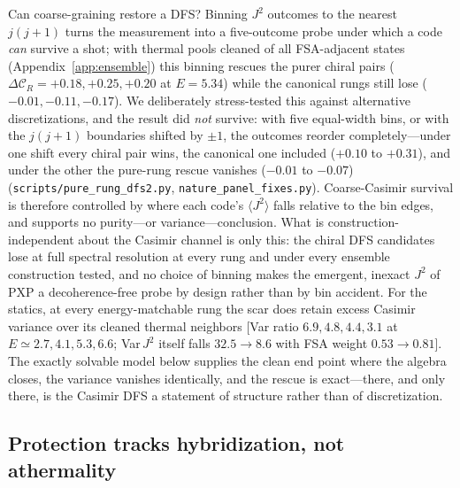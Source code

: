 \documentclass[a4paper,11pt,twocolumn,unpublished]{quantumarticle}
\newcommand{\CR}{\mathcal{C}_R}
\begin{document}
Can coarse-graining restore a DFS? Binning $J^2$ outcomes to the nearest
$j(j{+}1)$ turns the measurement into a five-outcome probe under which a
code \emph{can} survive a shot; with thermal pools cleaned of all
FSA-adjacent states (Appendix~\ref{app:ensemble}) this binning rescues the
purer chiral pairs ($\Delta\CR=+0.18,+0.25,+0.20$ at $E=5.34$) while the
canonical rungs still lose ($-0.01,-0.11,-0.17$). We deliberately
stress-tested this against alternative discretizations, and the result did
\emph{not} survive: with five equal-width bins, or with the $j(j{+}1)$
boundaries shifted by $\pm1$, the outcomes reorder completely---under one
shift every chiral pair wins, the canonical one included
($+0.10$ to $+0.31$), and under the other the pure-rung rescue vanishes
($-0.01$ to $-0.07$)
(\texttt{scripts/pure\_rung\_dfs2.py}, \texttt{nature\_panel\_fixes.py}).
Coarse-Casimir survival is therefore controlled by where each code's
$\langle J^2\rangle$ falls relative to the bin edges, and supports no
purity---or variance---conclusion. What is construction-independent about
the Casimir channel is only this: the chiral DFS candidates lose at full
spectral resolution at every rung and under every ensemble construction
tested, and no choice of binning makes the emergent, inexact $J^2$ of PXP a
decoherence-free probe by design rather than by bin accident. For the
statics, at every energy-matchable rung the scar does retain excess Casimir
variance over its cleaned thermal neighbors [Var ratio $6.9,4.8,4.4,3.1$ at
$E\simeq2.7,4.1,5.3,6.6$; Var$\,J^2$ itself falls $32.5\to8.6$ with FSA
weight $0.53\to0.81$]. The exactly solvable model below supplies the clean
end point where the algebra closes, the variance vanishes identically, and
the rescue is exact---there, and only there, is the Casimir DFS a
statement of structure rather than of discretization.

\subsection{Protection tracks hybridization, not athermality}
\label{sec:purity}
\end{document}
